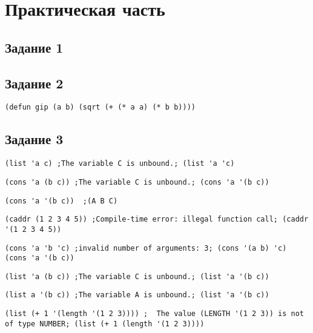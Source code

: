\chapter{Практическая часть}
\section{Задание 1}
\begin{center}	
	\centering
	\def\svgwidth{15cm}
	
	\label{ris:NRL2}
\end{center}
\section{Задание 2}
\begin{center}
	\begin{lstlisting}[label=a, caption={Выражение 1}]
(defun gip (a b) (sqrt (+ (* a a) (* b b))))
	\end{lstlisting}
\end{center}
\begin{center}	
	\centering
	\def\svgwidth{13cm}
	
	\label{ris:NRL}
\end{center}
\section{Задание 3}
\begin{center}
	\begin{lstlisting}[label=a3, caption={Выражение 1}]
(list 'a c) ;The variable C is unbound.; (list 'a 'c)
\end{lstlisting}
	\begin{lstlisting}[label=b3, caption={Выражение 2}]
(cons 'a (b c)) ;The variable C is unbound.; (cons 'a '(b c))
\end{lstlisting}
	\begin{lstlisting}[label=c3, caption={Выражение 3}]
(cons 'a '(b c))  ;(A B C)
\end{lstlisting}
	\begin{lstlisting}[label=d3, caption={Выражение 4}]
(caddr (1 2 3 4 5)) ;Compile-time error: illegal function call; (caddr '(1 2 3 4 5))
\end{lstlisting}
	\begin{lstlisting}[label=e3, caption={Выражение 5}]
(cons 'a 'b 'c) ;invalid number of arguments: 3; (cons '(a b) 'c) (cons 'a '(b c))  
\end{lstlisting}
	\begin{lstlisting}[label=f3, caption={Выражение 6}]
(list 'a (b c)) ;The variable C is unbound.; (list 'a '(b c))
\end{lstlisting}
	\begin{lstlisting}[label=g3, caption={Выражение 7}]
(list a '(b c)) ;The variable A is unbound.; (list 'a '(b c))
\end{lstlisting}
	\begin{lstlisting}[label=h3, caption={Выражение 8}]
(list (+ 1 '(length '(1 2 3)))) ;  The value (LENGTH '(1 2 3)) is not of type NUMBER; (list (+ 1 (length '(1 2 3)))) 
\end{lstlisting}
\end{center}
